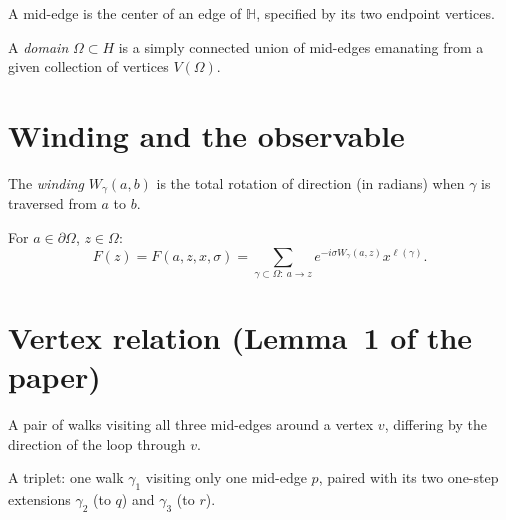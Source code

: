 \begin{definition}\label{def:mid_edge}
\leanok
{}
  A mid-edge is the center of an edge of $\mathbb{H}$, specified by its two endpoint vertices.
\end{definition}

\begin{definition}\label{def:hex_domain}
\leanok
{}
  A \emph{domain} $\Omega \subset H$ is a simply connected union of mid-edges
  emanating from a given collection of vertices $V(\Omega)$.
\end{definition}


\section{Winding and the observable}

\begin{definition}\label{def:winding}
\leanok
{}
  The \emph{winding} $W_\gamma(a,b)$ is the total rotation of direction (in radians)
  when $\gamma$ is traversed from $a$ to $b$.
\end{definition}

\begin{definition}\label{def:observable}
\leanok
{}
  For $a \in \partial\Omega$, $z \in \Omega$:
  \[ F(z) = F(a,z,x,\sigma) = \sum_{\gamma \subset \Omega:\ a \to z}
     e^{-i\sigma W_\gamma(a,z)} x^{\ell(\gamma)}. \]
\end{definition}


\section{Vertex relation (Lemma~1 of the paper)}

\begin{definition}\label{def:walk_pair}
\leanok
{}
  A pair of walks visiting all three mid-edges around a vertex $v$, differing by
  the direction of the loop through $v$.
\end{definition}

\begin{definition}\label{def:walk_triplet}
\leanok
{}
  A triplet: one walk $\gamma_1$ visiting only one mid-edge $p$,
  paired with its two one-step extensions $\gamma_2$ (to $q$) and $\gamma_3$ (to $r$).
\end{definition}

